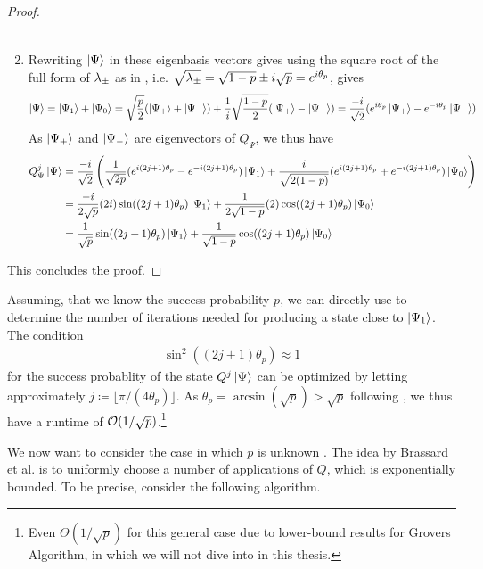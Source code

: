 \begin{proof}
\begin{enumerate}[label=(\roman*)]
\begin{align}
        \end{align}
        \item \label{aa_iteration_proof_3} Rewriting \(\ket{\Psi}\) in these eigenbasis vectors gives using the square root of the full form of \(\lambda_\pm\) as in , i.e. \(\sqrt{\lambda_\pm} = \sqrt{1-p} \pm i\sqrt{p} = e^{i\theta_p}\), gives
        \begin{align}
            \ket{\Psi} = \ket{\Psi_1} + \ket{\Psi_0} = \sqrt{\frac{p}{2}} (\ket{\Psi_+} + \ket{\Psi_-}) + \frac{1}{i} \sqrt{\frac{1-p}{2}} (\ket{\Psi_+} - \ket{\Psi_-}) = \frac{-i}{\sqrt{2}}(e^{i\theta_p}\ket{\Psi_+}-e^{-i\theta_p}\ket{\Psi_-})
        \end{align}
        As \(\ket{\Psi_+}\) and \(\ket{\Psi_-}\) are eigenvectors of \(Q_\Psi\), we thus have
        \begin{align}
            Q_\Psi^j\ket{\Psi} &= \frac{-i}{\sqrt{2}}\left(\frac{1}{\sqrt{2p}}(e^{i(2j+1)\theta_p}-e^{-i(2j+1)\theta_p})\ket{\Psi_1}+\frac{i}{\sqrt{2(1-p)}}(e^{i(2j+1)\theta_p}+e^{-i(2j+1)\theta_p})\ket{\Psi_0}\right)\\
            &= \frac{-i}{2\sqrt{p}}(2i)\sin((2j+1)\theta_p)\ket{\Psi_1} + \frac{1}{2\sqrt{1-p}}(2)\cos((2j+1)\theta_p)\ket{\Psi_0}\\
            &= \frac{1}{\sqrt{p}}\sin((2j+1)\theta_p)\ket{\Psi_1}+\frac{1}{\sqrt{1-p}}\cos((2j+1)\theta_p)\ket{\Psi_0}
        \end{align}
    \end{enumerate}
    This concludes the proof.
\end{proof}

Assuming, that we know the success probability \(p\), we can directly use  to determine the number of iterations needed for producing a state close to \(\ket{\Psi_1}\). The condition
\begin{align}
    \sin^2((2j+1)\theta_p) \approx 1
\end{align}
for the success probablity of the state \(Q^j\ket{\Psi}\) can be optimized by letting approximately \(j \coloneqq \lfloor \pi / (4 \theta_p) \rfloor\). As \(\theta_p = \arcsin(\sqrt{p}) > \sqrt{p}\) following , we thus have a runtime of \(\operatorname{\mathcal{O}}(1/\sqrt{p})\).\footnote{Even \(\Theta(1/\sqrt{p})\) for this general case due to lower-bound results for Grovers Algorithm, in which we will not dive into in this thesis.}

\phantom{}

We now want to consider the case in which \(p\) is unknown \cite[pp. 8-10]{Brassard2000}. The idea by Brassard et al. is to uniformly choose a number of applications of \(Q\), which is exponentially bounded. To be precise, consider the following algorithm.

